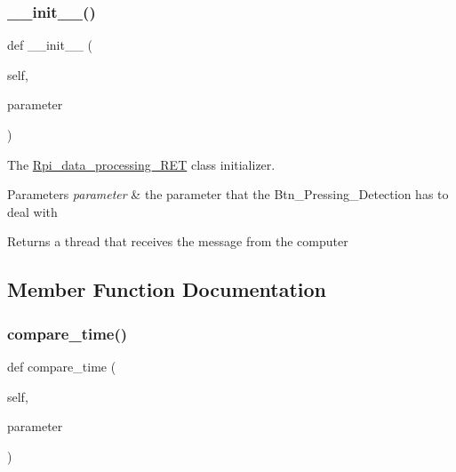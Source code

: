\subsubsection{\texorpdfstring{\+\_\+\+\_\+init\+\_\+\+\_\+()}{\_\_init\_\_()}}
{\footnotesize\ttfamily def \+\_\+\+\_\+init\+\_\+\+\_\+ (\begin{DoxyParamCaption}\item[{}]{self,  }\item[{}]{parameter }\end{DoxyParamCaption})}



The \hyperlink{a00033}{Rpi\+\_\+data\+\_\+processing\+\_\+\+R\+ET} class initializer. 


\begin{DoxyParams}{Parameters}
{\em parameter} & the parameter that the Btn\+\_\+\+Pressing\+\_\+\+Detection has to deal with \\
\hline
\end{DoxyParams}
\begin{DoxyReturn}{Returns}
a thread that receives the message from the computer 
\end{DoxyReturn}


\subsection{Member Function Documentation}
\mbox{\label{a00033_aabf1e0147a0b90298390d1d290899798}} 
\subsubsection{\texorpdfstring{compare\+\_\+time()}{compare\_time()}}
{\footnotesize\ttfamily def compare\+\_\+time (\begin{DoxyParamCaption}\item[{}]{self,  }\item[{}]{parameter }\end{DoxyParamCaption})}




